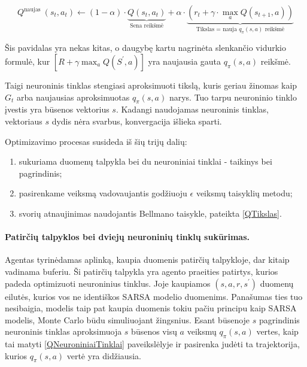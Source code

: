 \documentclass[a4paper, 12pt]{article}
\begin{document}
\begin{equation}
\label{QTikslas}
Q^{\text {naujas }}\left(s_{t}, a_{t}\right) \leftarrow(1-\alpha) \cdot \underbrace{Q\left(s_{t}, a_{t}\right)}_{\text{Sena reikšmė}}+\alpha \cdot\underbrace{(r_{t}+\gamma \cdot \max _{a} Q\left(s_{t+1}, a\right))}_{\text{Tikslas = nauja $q_{\pi}(s, a)$ reikšmė}}
\end{equation} 


Šis pavidalas yra nekas kitas, o daugybę kartu nagrinėta slenkančio vidurkio formulė, kur $\left[R+\gamma \max _{a} Q\left(S^{\prime}, a\right)\right]$ yra naujausia gauta $q_{\pi}(s, a)$ reikšmė.

Taigi neuroninis tinklas stengiasi aproksimuoti tikslą, kuris geriau žinomas kaip $G_t$ arba naujausias aproksimuotas $q_{\pi}(s, a)$ narys. Tuo tarpu neuroninio tinklo įvestis yra būsenos vektorius $s$. Kadangi naudojamas neuroninis tinklas, vektoriaus $s$ dydis nėra svarbus, konvergacija išlieka sparti. 

Optimizavimo procesas susideda iš šių trijų dalių:

\begin{enumerate}
  \addtolength{\itemsep}{-0.5\baselineskip} 
  \item sukuriama duomenų talpykla bei du neuroniniai tinklai - taikinys bei pagrindinis;
  \item pasirenkame veiksmą vadovaujantis godžiuoju $\epsilon$ veiksmų taisyklių metodu;
  \item svorių atnaujinimas naudojantis Bellmano taisykle, pateikta \ref{QTikslas}.
\end{enumerate}

\paragraph{Patirčių talpyklos bei dviejų neuroninių tinklų sukūrimas.}
\label{TalpyklosSkyrius}
Agentas tyrinėdamas aplinką, kaupia duomenis patirčių talpykloje, dar kitaip vadinama buferiu. Ši patirčių talpykla yra agento praeities patirtys, kurios padeda optimizuoti neuroninius tinklus. Joje kaupiamos $(s,a,r,s^\prime)$ duomenų eilutės, kurios vos ne identiškos SARSA modelio duomenims. Panašumas ties tuo nesibaigia, modelis taip pat kaupia duomenis tokiu pačiu principu kaip SARSA modelis, Monte Carlo būdu simuliuojant žingsnius. Esant būsenoje $s$ pagrindinis neuroninis tinklas aproksimuoja $s$ būsenos visų $a$ veiksmų $q_{\pi}(s, a)$ vertes, kaip tai matyti \ref{QNeuroniniaiTinklai} paveikslėlyje ir pasirenka judėti ta trajektorija, kurios $q_{\pi}(s, a)$ vertė yra didžiausia. 
\end{document}
